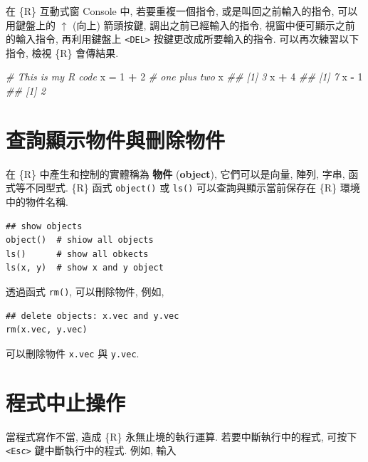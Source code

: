 \documentclass[
]{book}
\newenvironment{Shaded}{\begin{snugshade}}{\end{snugshade}}
\newcommand{\CommentTok}[1]{\textcolor[rgb]{0.56,0.35,0.01}{\textit{#1}}}
\newcommand{\DecValTok}[1]{\textcolor[rgb]{0.00,0.00,0.81}{#1}}
\newcommand{\NormalTok}[1]{#1}
\newcommand{\OperatorTok}[1]{\textcolor[rgb]{0.81,0.36,0.00}{\textbf{#1}}}
\newcommand{\StringTok}[1]{\textcolor[rgb]{0.31,0.60,0.02}{#1}}
\begin{document}
在 \{R\} 互動式窗 Console 中, 若要重複一個指令, 或是叫回之前輸入的指令,
可以用鍵盤上的 \(\uparrow\) (向上) 箭頭按鍵,
調出之前已經輸入的指令, 視窗中便可顯示之前的輸入指令,
再利用鍵盤上 \texttt{\textless{}DEL\textgreater{}} 按鍵更改成所要輸入的指令.
可以再次練習以下指令, 檢視 \{R\} 會傳結果.

\begin{Shaded}
\begin{Highlighting}[]
\CommentTok{\# This is my R code}
\NormalTok{x =}\StringTok{ }\DecValTok{1} \OperatorTok{+}\StringTok{ }\DecValTok{2}  \CommentTok{\# one plus two}
\NormalTok{x}
\CommentTok{\#\# [1] 3}
\NormalTok{x }\OperatorTok{+}\StringTok{ }\DecValTok{4}
\CommentTok{\#\# [1] 7}
\NormalTok{x }\OperatorTok{{-}}\StringTok{ }\DecValTok{1}
\CommentTok{\#\# [1] 2}
\end{Highlighting}
\end{Shaded}

\hypertarget{ux67e5ux8a62ux986fux793aux7269ux4ef6ux8207ux522aux9664ux7269ux4ef6}{%
\section{查詢顯示物件與刪除物件}\label{ux67e5ux8a62ux986fux793aux7269ux4ef6ux8207ux522aux9664ux7269ux4ef6}}

在 \{R\} 中產生和控制的實體稱為
\textbf{物件}
(\textbf{object}),
它們可以是向量, 陣列, 字串, 函式等不同型式.
\{R\} 函式
\texttt{object()}
或
\texttt{ls()}
可以查詢與顯示當前保存在 \{R\} 環境中的物件名稱.

\begin{verbatim}
## show objects
object()  # shiow all objects
ls()      # show all obkects
ls(x, y)  # show x and y object
\end{verbatim}

透過函式 \texttt{rm()},
可以刪除物件, 例如,

\begin{verbatim}
## delete objects: x.vec and y.vec 
rm(x.vec, y.vec)
\end{verbatim}

可以刪除物件 \texttt{x.vec} 與 \texttt{y.vec}.

\hypertarget{ux7a0bux5f0fux4e2dux6b62ux64cdux4f5c}{%
\section{程式中止操作}\label{ux7a0bux5f0fux4e2dux6b62ux64cdux4f5c}}

當程式寫作不當, 造成 \{R\} 永無止境的執行運算.
若要中斷執行中的程式,
可按下 \texttt{\textless{}Esc\textgreater{}} 鍵中斷執行中的程式.
例如, 輸入
\end{document}
